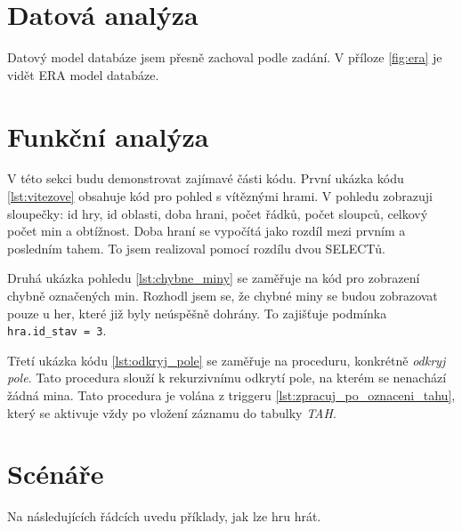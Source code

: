 \documentclass{article}
\begin{document}
\section{Datová analýza}
Datový model databáze jsem přesně zachoval podle zadání.
V příloze \ref{fig:era} je vidět ERA model databáze.


\section{Funkční analýza}
V této sekci budu demonstrovat zajímavé části kódu.
První ukázka kódu \ref{lst:vitezove} obsahuje kód pro pohled s vítěznými hrami.
V pohledu zobrazuji sloupečky: id hry, id oblasti, doba hrani, počet řádků, počet sloupců,
celkový počet min a obtížnost. Doba hraní se vypočítá jako rozdíl mezi prvním
a posledním tahem. To jsem realizoval pomocí rozdílu dvou SELECTů.

\begin{minipage}{\linewidth}

\end{minipage}


Druhá ukázka pohledu \ref{lst:chybne_miny} se zaměřuje na kód pro zobrazení chybně označených min.
Rozhodl jsem se, že chybné miny se budou zobrazovat pouze u her, které již byly neúspěšně
dohrány. To zajišťuje podmínka \lstinline{hra.id_stav = 3}.

\begin{minipage}{\linewidth}

\end{minipage}

Třetí ukázka kódu \ref{lst:odkryj_pole} se zaměřuje na proceduru, 
konkrétně \textit{odkryj pole}. Tato procedura slouží k rekurzivnímu odkrytí pole, 
na kterém se nenachází žádná mina. 
Tato procedura je volána z triggeru \ref{lst:zpracuj_po_oznaceni_tahu}, 
který se aktivuje vždy po vložení záznamu do tabulky \textit{TAH}.

\begin{minipage}{\linewidth}

\end{minipage}

\section{Scénáře}
Na následujících řádcích uvedu příklady, jak lze hru hrát.
\end{document}
